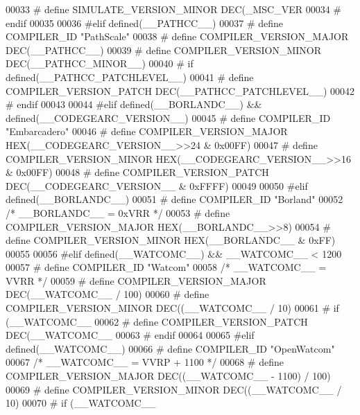 \begin{DoxyCode}
{{00033 \textcolor{preprocessor}{#  define SIMULATE\_VERSION\_MINOR DEC(\_MSC\_VER %
00034 \textcolor{preprocessor}{# endif}
00035 
00036 \textcolor{preprocessor}{#elif defined(\_\_PATHCC\_\_)}
00037 \textcolor{preprocessor}{# define COMPILER\_ID "PathScale"}
00038 \textcolor{preprocessor}{# define COMPILER\_VERSION\_MAJOR DEC(\_\_PATHCC\_\_)}
00039 \textcolor{preprocessor}{# define COMPILER\_VERSION\_MINOR DEC(\_\_PATHCC\_MINOR\_\_)}
00040 \textcolor{preprocessor}{# if defined(\_\_PATHCC\_PATCHLEVEL\_\_)}
00041 \textcolor{preprocessor}{#  define COMPILER\_VERSION\_PATCH DEC(\_\_PATHCC\_PATCHLEVEL\_\_)}
00042 \textcolor{preprocessor}{# endif}
00043 
00044 \textcolor{preprocessor}{#elif defined(\_\_BORLANDC\_\_) && defined(\_\_CODEGEARC\_VERSION\_\_)}
00045 \textcolor{preprocessor}{# define COMPILER\_ID "Embarcadero"}
00046 \textcolor{preprocessor}{# define COMPILER\_VERSION\_MAJOR HEX(\_\_CODEGEARC\_VERSION\_\_>>24 & 0x00FF)}
00047 \textcolor{preprocessor}{# define COMPILER\_VERSION\_MINOR HEX(\_\_CODEGEARC\_VERSION\_\_>>16 & 0x00FF)}
00048 \textcolor{preprocessor}{# define COMPILER\_VERSION\_PATCH DEC(\_\_CODEGEARC\_VERSION\_\_     & 0xFFFF)}
00049 
00050 \textcolor{preprocessor}{#elif defined(\_\_BORLANDC\_\_)}
00051 \textcolor{preprocessor}{# define COMPILER\_ID "Borland"}
00052   \textcolor{comment}{/* \_\_BORLANDC\_\_ = 0xVRR */}
00053 \textcolor{preprocessor}{# define COMPILER\_VERSION\_MAJOR HEX(\_\_BORLANDC\_\_>>8)}
00054 \textcolor{preprocessor}{# define COMPILER\_VERSION\_MINOR HEX(\_\_BORLANDC\_\_ & 0xFF)}
00055 
00056 \textcolor{preprocessor}{#elif defined(\_\_WATCOMC\_\_) && \_\_WATCOMC\_\_ < 1200}
00057 \textcolor{preprocessor}{# define COMPILER\_ID "Watcom"}
00058    \textcolor{comment}{/* \_\_WATCOMC\_\_ = VVRR */}
00059 \textcolor{preprocessor}{# define COMPILER\_VERSION\_MAJOR DEC(\_\_WATCOMC\_\_ / 100)}
00060 \textcolor{preprocessor}{# define COMPILER\_VERSION\_MINOR DEC((\_\_WATCOMC\_\_ / 10) %
00061 \textcolor{preprocessor}{# if (\_\_WATCOMC\_\_ %
00062 \textcolor{preprocessor}{#  define COMPILER\_VERSION\_PATCH DEC(\_\_WATCOMC\_\_ %
00063 \textcolor{preprocessor}{# endif}
00064 
00065 \textcolor{preprocessor}{#elif defined(\_\_WATCOMC\_\_)}
00066 \textcolor{preprocessor}{# define COMPILER\_ID "OpenWatcom"}
00067    \textcolor{comment}{/* \_\_WATCOMC\_\_ = VVRP + 1100 */}
00068 \textcolor{preprocessor}{# define COMPILER\_VERSION\_MAJOR DEC((\_\_WATCOMC\_\_ - 1100) / 100)}
00069 \textcolor{preprocessor}{# define COMPILER\_VERSION\_MINOR DEC((\_\_WATCOMC\_\_ / 10) %
00070 \textcolor{preprocessor}{# if (\_\_WATCOMC\_\_ %
}}}}}}}}
\end{DoxyCode}
